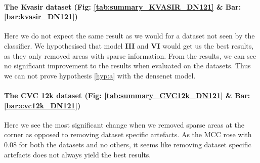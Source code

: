 \paragraph{The Kvasir dataset (Fig: \ref{tab:summary_KVASIR_DN121} \& Bar: \ref{bar:kvasir_DN121})}
Here we do not expect the same result as we would for a dataset not seen by the classifier. We hypothesised that model \textbf{III} and \textbf{VI} would get us the best results, as they only removed areas with sparse information. From the results, we can see no significant improvement to the results when evaluated on the datasets. Thus we can not prove hypothesis \ref{hyp:a} with the densenet model.

\paragraph{The CVC 12k dataset (Fig: \ref{tab:summary_CVC12k_DN121} \& Bar: \ref{bar:cvc12k_DN121})}
Here we see the most significant change when we removed sparse areas at the corner as opposed to removing dataset specific artefacts. As the MCC rose with 0.08 for both the datasets and no others, it seems like removing dataset specific artefacts does not always yield the best results.


